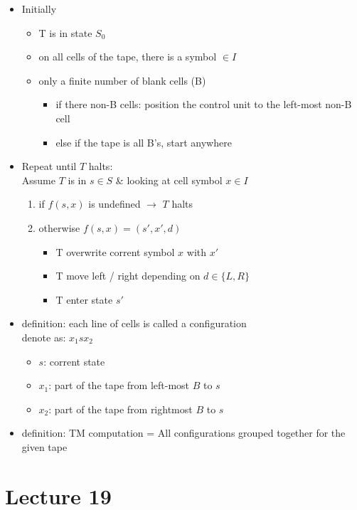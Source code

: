 \documentclass[11pt]{article}
\begin{document}
\begin{itemize}
    \item Initially
    \begin{itemize}
        \item T is in state $S_0$
        \item on all cells of the tape, there is a symbol $\in I$
        \item only a finite number of blank cells (B)
        \begin{itemize}
            \item if there non-B cells: position the control unit to the left-most non-B cell 
            \item else if the tape is all B's, start anywhere 
        \end{itemize}
    \end{itemize}
    \item Repeat until $T$ halts: \\
    Assume $T$ is in $s\in S$ \& looking at cell symbol $x\in I$
    \begin{enumerate}
        \item if $f(s,x)$ is undefined $\rightarrow$ $T$ halts 
        \item otherwise $f(s,x) = (s',x',d)$
        \begin{itemize}
            \item T overwrite corrent symbol $x$ with $x'$
            \item T move left / right depending on $d\in\{L,R\}$
            \item T enter state $s'$
        \end{itemize}
    \end{enumerate}
    \item definition: each line of cells is called a configuration \\
    denote as: $x_1sx_2$
    \begin{itemize}
        \item $s$: corrent state 
        \item $x_1$: part of the tape from left-most $B$ to $s$
        \item $x_2$: part of the tape from rightmost $B$ to $s$
    \end{itemize}
    \item definition: TM computation = All configurations grouped together for the given tape 
\end{itemize}


\section{Lecture 19}
\end{document}
